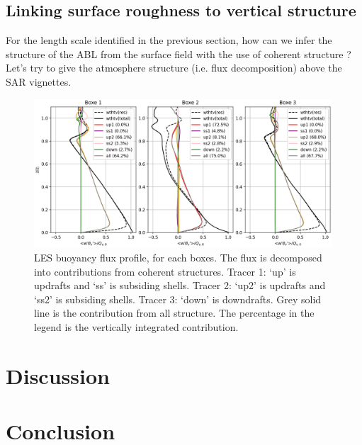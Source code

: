 \documentclass[draft]{agujournal2019} %
\begin{document}
            \subsection{Linking surface roughness to vertical structure}
            \label{subsection_Link_surface_to_vertical}

            For the length scale identified in the previous section, how can we infer the structure of the ABL from the surface field with the use of coherent structure ? Let's try to give the atmosphere structure (i.e. flux decomposition) above the SAR vignettes. 

            \begin{figure}[h!]
                \centering
                \includegraphics[width=0.99\textwidth]{wthtv_split.png}
                \caption{LES buoyancy flux profile, for each boxes. The flux is decomposed into contributions from coherent structures. Tracer 1: `up' is updrafts and `ss' is subsiding shells. Tracer 2:  `up2' is updrafts and `ss2' is subsiding shells. Tracer 3: `down' is downdrafts. Grey solid line is the contribution from all structure. The percentage in the legend is the vertically integrated contribution.}
                \label{wthtv_CS}
            \end{figure} 
                
            
		\section{Discussion}
		\label{section_discussion}
			
		
		\section{Conclusion}
        \label{section_conclusion}
         
\end{document}
